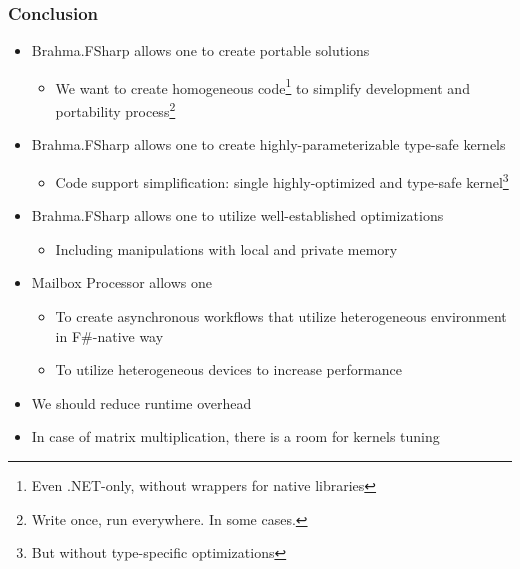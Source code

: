 \documentclass[xcolor=table,aspectratio=169]{beamer}
\begin{document}
\begin{frame}[t]
  \frametitle{Conclusion}
  \begin{itemize}
    \item Brahma.FSharp allows one to create portable solutions
    \begin{itemize}
      \item We want to create homogeneous code\footnote{Even .NET-only, without wrappers for native libraries} to simplify development and portability process\footnote{Write once, run everywhere. In some cases.} 
    \end{itemize}
    \item Brahma.FSharp allows one to create highly-parameterizable type-safe kernels 
    \begin{itemize}
      \item Code support simplification: single highly-optimized  and type-safe kernel\footnote{But without type-specific optimizations}
    \end{itemize}
    \item Brahma.FSharp allows one to utilize well-established optimizations 
    \begin{itemize}
      \item Including manipulations with local and private memory
    \end{itemize}
    \item Mailbox Processor allows one 
    \begin{itemize}
      \item To create asynchronous workflows that utilize heterogeneous environment in F\#-native way 
      \item To utilize heterogeneous devices to increase performance 
    \end{itemize}
    
    \vfill
    \item We should reduce runtime overhead
    \item In case of matrix multiplication, there is a room for kernels tuning
  \end{itemize}
\end{frame}
\end{document}
